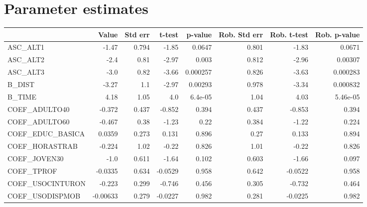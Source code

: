 \section{Parameter estimates}
\begin{tabular}{lrrrrrrr}
\toprule
{} &    Value &  Std err &  t-test &  p-value &  Rob. Std err &  Rob. t-test &  Rob. p-value \\
\midrule
ASC\_ALT1         &    -1.47 &    0.794 &   -1.85 &   0.0647 &         0.801 &        -1.83 &        0.0671 \\
ASC\_ALT2         &     -2.4 &     0.81 &   -2.97 &    0.003 &         0.812 &        -2.96 &       0.00307 \\
ASC\_ALT3         &     -3.0 &     0.82 &   -3.66 & 0.000257 &         0.826 &        -3.63 &      0.000283 \\
B\_DIST           &    -3.27 &      1.1 &   -2.97 &  0.00293 &         0.978 &        -3.34 &      0.000832 \\
B\_TIME           &     4.18 &     1.05 &     4.0 &  6.4e-05 &          1.04 &         4.03 &      5.46e-05 \\
COEF\_ADULTO40    &   -0.372 &    0.437 &  -0.852 &    0.394 &         0.437 &       -0.853 &         0.394 \\
COEF\_ADULTO60    &   -0.467 &     0.38 &   -1.23 &     0.22 &         0.384 &        -1.22 &         0.224 \\
COEF\_EDUC\_BASICA &   0.0359 &    0.273 &   0.131 &    0.896 &          0.27 &        0.133 &         0.894 \\
COEF\_HORASTRAB   &   -0.224 &     1.02 &   -0.22 &    0.826 &          1.01 &        -0.22 &         0.826 \\
COEF\_JOVEN30     &     -1.0 &    0.611 &   -1.64 &    0.102 &         0.603 &        -1.66 &         0.097 \\
COEF\_TPROF       &  -0.0335 &    0.634 & -0.0529 &    0.958 &         0.642 &      -0.0522 &         0.958 \\
COEF\_USOCINTURON &   -0.223 &    0.299 &  -0.746 &    0.456 &         0.305 &       -0.732 &         0.464 \\
COEF\_USODISPMOB  & -0.00633 &    0.279 & -0.0227 &    0.982 &         0.281 &      -0.0225 &         0.982 \\
\bottomrule
\end{tabular}

